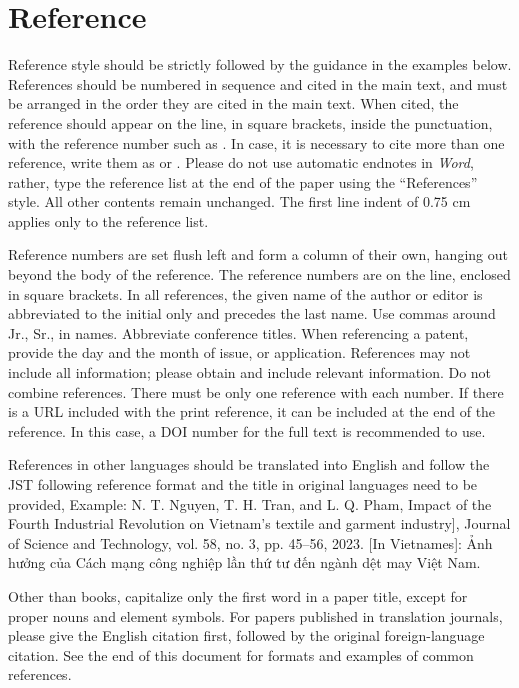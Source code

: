 \section*{Reference}
Reference style should be strictly followed by the guidance in the examples below. References should be numbered in sequence and cited in the main text, and must be arranged in the order they are cited in the main text. When cited, the reference should appear on the line, in square brackets, inside the punctuation, with the reference number such as \cite{BookTemplate}. In case, it is necessary to cite more than one reference, write them as \cite{BookTemplate, ArticleTemplate, ReportTemplate} or \cite{BookTemplate, HanbookTemplate, ReportHanbookOnlineTemplate}. Please do not use automatic endnotes in \textit{Word}, rather, type the reference list at the end of the paper using the “References” style. All other contents remain unchanged. The first line indent of 0.75 cm applies only to the reference list.

Reference numbers are set flush left and form a column of their own, hanging out beyond the body of the reference. The reference numbers are on the line, enclosed in square brackets. In all references, the given name of the author or editor is abbreviated to the initial only and precedes the last name. Use commas around Jr., Sr., in names. Abbreviate conference titles. When referencing a patent, provide the day and the month of issue, or application. References may not include all information; please obtain and include relevant information. Do not combine references. There must be only one reference with each number. If there is a URL included with the print reference, it can be included at the end of the reference. In this case, a DOI number for the full text is recommended to use.

References in other languages should be translated into English and follow the JST following reference format and the title in original languages need to be provided, Example: N. T. Nguyen, T. H. Tran, and L. Q. Pham, Impact of the Fourth Industrial Revolution on Vietnam's textile and garment industry], Journal of Science and Technology, vol. 58, no. 3, pp. 45--56, 2023. [In Vietnames]: Ảnh hưởng của Cách mạng công nghiệp lần thứ tư đến ngành dệt may Việt Nam.

Other than books, capitalize only the first word in a paper title, except for proper nouns and element symbols. For papers published in translation journals, please give the English citation first, followed by the original foreign-language citation. See the end of this document for formats and examples of common references.

